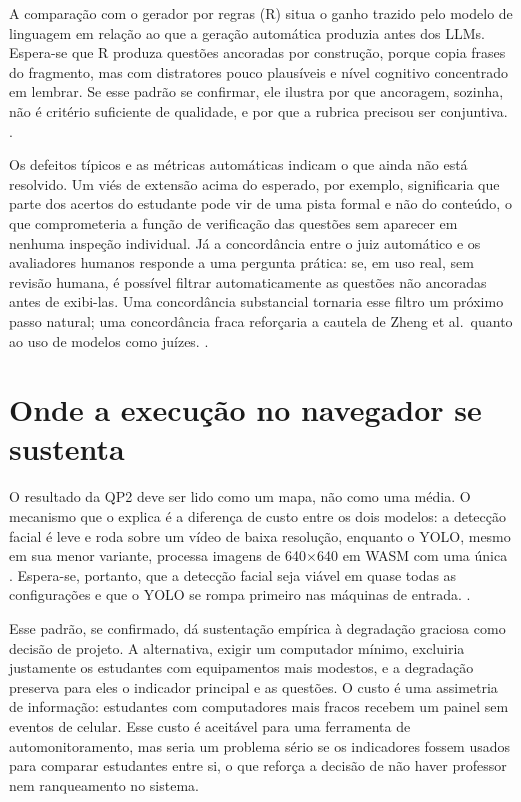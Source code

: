 A comparação com o gerador por regras (R) situa o ganho trazido pelo modelo de linguagem em relação ao que a geração automática produzia antes dos LLMs. Espera-se que R produza questões ancoradas por construção, porque copia frases do fragmento, mas com distratores pouco plausíveis e nível cognitivo concentrado em lembrar. Se esse padrão se confirmar, ele ilustra por que ancoragem, sozinha, não é critério suficiente de qualidade, e por que a rubrica precisou ser conjuntiva. .

Os defeitos típicos e as métricas automáticas indicam o que ainda não está resolvido. Um viés de extensão acima do esperado, por exemplo, significaria que parte dos acertos do estudante pode vir de uma pista formal e não do conteúdo, o que comprometeria a função de verificação das questões sem aparecer em nenhuma inspeção individual. Já a concordância entre o juiz automático e os avaliadores humanos responde a uma pergunta prática: se, em uso real, sem revisão humana, é possível filtrar automaticamente as questões não ancoradas antes de exibi-las. Uma concordância substancial tornaria esse filtro um próximo passo natural; uma concordância fraca reforçaria a cautela de Zheng et al.\ quanto ao uso de modelos como juízes. .

\section{Onde a execução no navegador se sustenta}

O resultado da QP2 deve ser lido como um mapa, não como uma média. O mecanismo que o explica é a diferença de custo entre os dois modelos: a detecção facial é leve e roda sobre um vídeo de baixa resolução, enquanto o YOLO, mesmo em sua menor variante, processa imagens de 640$\times$640  em WASM com uma única . Espera-se, portanto, que a detecção facial seja viável em quase todas as configurações e que o YOLO se rompa primeiro nas máquinas de entrada. .

Esse padrão, se confirmado, dá sustentação empírica à degradação graciosa como decisão de projeto. A alternativa, exigir um computador mínimo, excluiria justamente os estudantes com equipamentos mais modestos, e a degradação preserva para eles o indicador principal e as questões. O custo é uma assimetria de informação: estudantes com computadores mais fracos recebem um painel sem eventos de celular. Esse custo é aceitável para uma ferramenta de automonitoramento, mas seria um problema sério se os indicadores fossem usados para comparar estudantes entre si, o que reforça a decisão de não haver professor nem ranqueamento no sistema.

